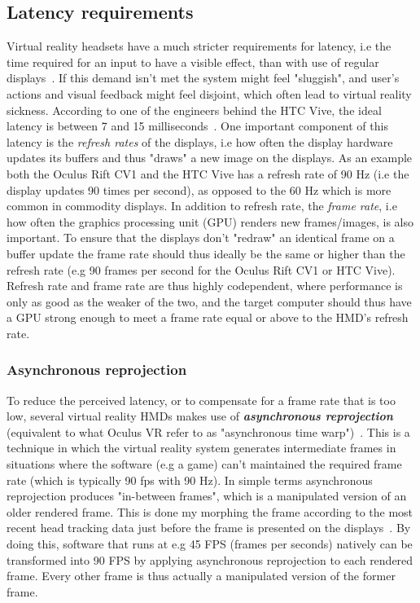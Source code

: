 \subsection{Latency requirements}
Virtual reality headsets have a much stricter requirements for latency, i.e the time required for an input to have a visible effect, 
than with use of regular displays~\citep{ROADTOVR2013}. If this demand isn't met the system might feel "sluggish", and user's actions and 
visual feedback might feel disjoint, which often lead to virtual reality sickness. According to one of the engineers behind the HTC Vive, the ideal
latency is between 7 and 15 milliseconds~\citep{ARSTECHNICA2013}. One important component of this latency is the \textit{refresh rates} of the displays, i.e 
how often the display hardware updates its buffers and thus "draws" a new image on the displays. As an example both the Oculus Rift CV1 and the HTC Vive
has a refresh rate of 90 Hz (i.e the display updates 90 times per second), as opposed to the 60 Hz which is more common in commodity displays.
In addition to refresh rate, the \textit{frame rate}, i.e how often the graphics processing unit (GPU) renders new frames/images, is also important. To ensure 
that the displays don't "redraw" an identical frame on a buffer update the frame rate should thus ideally be the same or higher than the refresh 
rate (e.g 90 frames per second for the Oculus Rift CV1 or HTC Vive). Refresh rate and frame rate are thus highly codependent, where performance is only as good as the weaker
of the two, and the target computer should thus have a GPU strong enough to meet a frame rate equal or above to the HMD's refresh rate. 

\subsubsection{Asynchronous reprojection}
To reduce the perceived latency, or to compensate for a frame rate that is too low, several virtual reality HMDs makes use of \textbf{\textit{asynchronous reprojection}} 
(equivalent to what Oculus VR refer to as "asynchronous time warp")~\citep{GD2016}. This is a technique in which the virtual reality system generates intermediate frames 
in situations where the software (e.g a game) can't maintained the required frame rate (which is typically 90 fps with 90 Hz). In simple terms asynchronous reprojection 
produces "in-between frames", which is a manipulated version of an older rendered frame. This is done my morphing the frame according to the most recent head tracking data just 
before the frame is presented on the displays~\citep{GD2016}. By doing this, software that runs at e.g 45 FPS (frames per seconds) natively can be transformed into 90 FPS by 
applying asynchronous reprojection to each rendered frame. Every other frame is thus actually a manipulated version of the former frame. 


